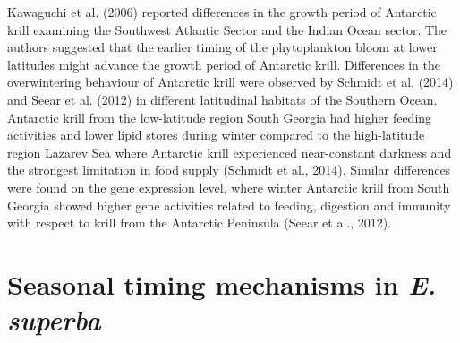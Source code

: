 Kawaguchi et al. (2006) reported differences in the growth period of Antarctic
krill examining the Southwest Atlantic Sector and the Indian Ocean sector. The
authors suggested that the earlier timing of the phytoplankton bloom at lower
latitudes might advance the growth period of Antarctic krill. Differences in
the overwintering behaviour of Antarctic krill were observed by Schmidt et al.
(2014) and Seear et al. (2012) in different latitudinal habitats of the
Southern Ocean. Antarctic krill from the low-latitude region South Georgia had
higher feeding activities and lower lipid stores during winter compared to the
high-latitude region Lazarev Sea where Antarctic krill experienced
near-constant darkness and the strongest limitation in food supply (Schmidt et
al., 2014). Similar differences were found on the gene expression level, where
winter Antarctic krill from South Georgia showed higher gene activities related
to feeding, digestion and immunity with respect to krill from the Antarctic
Peninsula (Seear et al., 2012).

\section*{Seasonal timing mechanisms in \textit{E. superba}}

